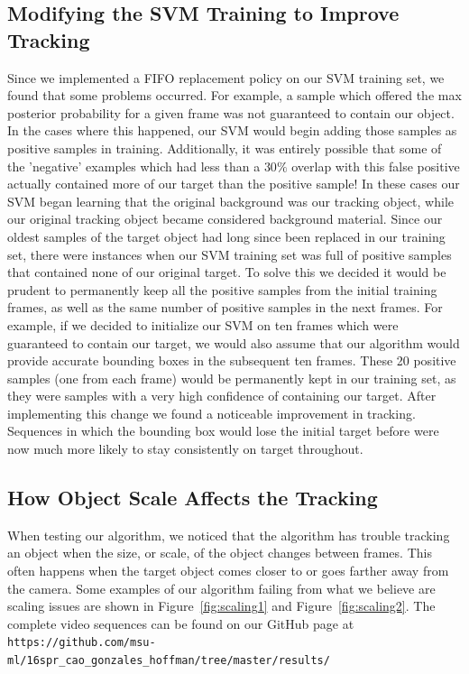 \documentclass{sig-alternate-05-2015}
\begin{document}
\subsection{Modifying the SVM Training to Improve Tracking}
Since we implemented a FIFO replacement policy on our SVM training set, we found that some problems occurred. For example, a sample which offered the max posterior probability for a given frame was not guaranteed to contain our object. In the cases where this happened, our SVM would begin adding those samples as positive samples in training. Additionally, it was entirely possible that some of the 'negative' examples which had less than a $30\%$ overlap with this false positive actually contained more of our target than the positive sample! In these cases our SVM began learning that the original background was our tracking object, while our original tracking object became considered background material. Since our oldest samples of the target object had long since been replaced in our training set, there were instances when our SVM training set was full of positive samples that contained none of our original target. To solve this we decided it would be prudent to permanently keep all the positive samples from the initial training frames, as well as the same number of positive samples in the next frames. For example, if we decided to initialize our SVM on ten frames which were guaranteed to contain our target, we would also assume that our algorithm would provide accurate bounding boxes in the subsequent ten frames. These 20 positive samples (one from each frame) would be permanently kept in our training set, as they were samples with a very high confidence of containing our target. After implementing this change we found a noticeable improvement in tracking. Sequences in which the bounding box would lose the initial target before were now much more likely to stay consistently on target throughout.   

\subsection{How Object Scale Affects the Tracking}
When testing our algorithm, we noticed that the algorithm has trouble tracking an object when the size, or scale, of the object changes between frames.
This often happens when the target object comes closer to or goes farther away from the camera.
Some examples of our algorithm failing from what we believe are scaling issues are shown in Figure~\ref{fig:scaling1} and Figure~\ref{fig:scaling2}.
The complete video sequences can be found on our GitHub page at \verb!https://github.com/msu-ml/16spr_cao_gonzales_hoffman/tree/master/results/! 
\end{document}
